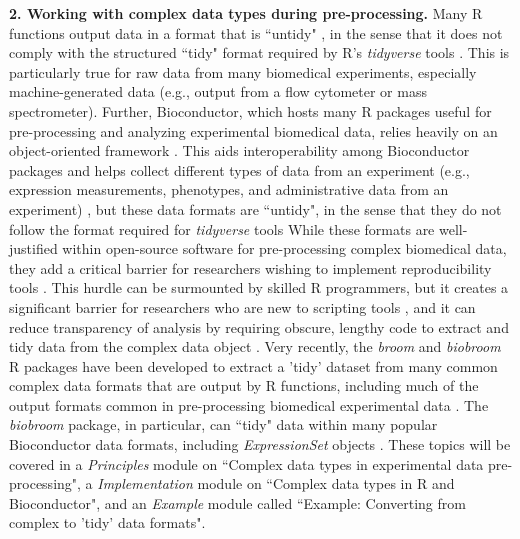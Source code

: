 \documentclass[pdftex,english,11pt,parskip=half]{scrartcl}
\begin{document}
\textbf{2. Working with complex data types during pre-processing.} Many R functions output data in a format that is ``untidy" \cite{robinson2014broom}, in the sense that it does not comply with the structured ``tidy" format required by R's \textit{tidyverse} tools \cite{wickham2014tidy}. This is particularly true for raw data from many biomedical experiments, especially machine-generated data (e.g., output from a flow cytometer or mass spectrometer). Further, Bioconductor, which hosts many R packages useful for pre-processing and analyzing experimental biomedical data, relies heavily on an object-oriented framework \cite{gentleman2004bioconductor}.  This aids interoperability among Bioconductor packages and helps collect different types of data from an experiment (e.g., expression measurements, phenotypes, and administrative data from an experiment) \cite{gentleman2004bioconductor}, but these data formats are ``untidy", in the sense that they do not follow the format required for \textit{tidyverse} tools \cite{biobroom} While these formats are well-justified within open-source software for pre-processing complex biomedical data, they add a critical barrier for researchers wishing
to implement reproducibility tools \cite{robinson2014broom}. This hurdle can be surmounted by skilled R programmers, but it creates a significant barrier for researchers who are new to scripting tools \cite{robinson2014broom}, and it can reduce transparency of analysis by requiring obscure, lengthy code to extract and tidy data from the complex data object \cite{robinson2014broom}. Very recently, the \textit{broom} and \textit{biobroom} R packages have been developed 
to extract a 'tidy' dataset from many common complex data formats that are output by R functions, including much of the output formats common in pre-processing biomedical experimental data \cite{robinson2014broom, biobroom}.
The \textit{biobroom} package, in particular, can ``tidy" data within many popular Bioconductor data formats, including \textit{ExpressionSet} objects \cite{biobroom}. These topics will be covered in a \textit{Principles} module on ``Complex data types in
experimental data pre-processing", a \textit{Implementation} module on ``Complex
data types in R and Bioconductor", and an \textit{Example} module called
``Example: Converting from complex to 'tidy' data formats".
\end{document}
